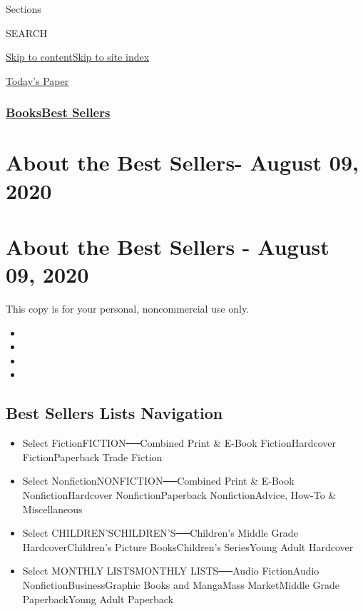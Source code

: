 Sections

SEARCH

\protect\hyperlink{site-content}{Skip to
content}\protect\hyperlink{site-index}{Skip to site index}

\href{https://myaccount.nytimes3xbfgragh.onion/auth/login?response_type=cookie\&client_id=vi}{}

\href{https://www.nytimes3xbfgragh.onion/section/todayspaper}{Today's
Paper}

\hypertarget{booksbest-sellers}{%
\subsubsection{\texorpdfstring{\href{/section/books/}{Books}\textbar{}\href{/books/best-sellers/}{Best
Sellers}}{Books\textbar{}Best Sellers}}\label{booksbest-sellers}}

\hypertarget{about-the-best-sellers--august-09-2020}{%
\section{About the Best Sellers- August 09,
2020}\label{about-the-best-sellers--august-09-2020}}

\hypertarget{about-the-best-sellers---august-09-2020}{%
\section{About the Best Sellers - August 09,
2020}\label{about-the-best-sellers---august-09-2020}}

This copy is for your personal, noncommercial use only.

\begin{itemize}
\item
\item
\item
\item
\end{itemize}

\hypertarget{best-sellers-lists-navigation}{%
\subsection{Best Sellers Lists
Navigation}\label{best-sellers-lists-navigation}}

\begin{itemize}
\tightlist
\item
  Select FictionFICTION──Combined Print \& E-Book FictionHardcover
  FictionPaperback Trade Fiction
\item
  Select NonfictionNONFICTION──Combined Print \& E-Book
  NonfictionHardcover NonfictionPaperback NonfictionAdvice, How-To \&
  Miscellaneous
\item
  Select CHILDREN'SCHILDREN'S──Children's Middle Grade
  HardcoverChildren's Picture BooksChildren's SeriesYoung Adult
  Hardcover
\item
  Select MONTHLY LISTSMONTHLY LISTS──Audio FictionAudio
  NonfictionBusinessGraphic Books and MangaMass MarketMiddle Grade
  PaperbackYoung Adult Paperback
\end{itemize}

